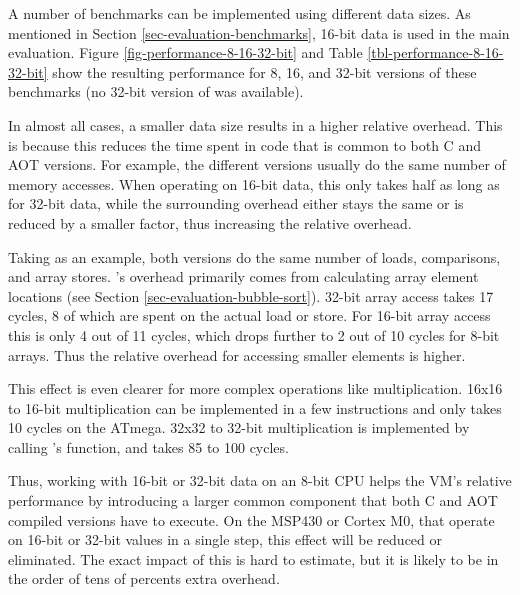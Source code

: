 A number of benchmarks can be implemented using different data sizes. As mentioned in Section \ref{sec-evaluation-benchmarks}, 16-bit data is used in the main evaluation. Figure \ref{fig-performance-8-16-32-bit} and Table \ref{tbl-performance-8-16-32-bit} show the resulting performance for 8, 16, and 32-bit versions of these benchmarks (no 32-bit version of  was available).

In almost all cases, a smaller data size results in a higher relative overhead. This is because this reduces the time spent in code that is common to both C and AOT versions. For example, the different versions usually do the same number of memory accesses. When operating on 16-bit data, this only takes half as long as for 32-bit data, while the surrounding overhead either stays the same or is reduced by a smaller factor, thus increasing the relative overhead.

Taking  as an example, both versions do the same number of loads, comparisons, and array stores. 's overhead primarily comes from calculating array element locations (see Section \ref{sec-evaluation-bubble-sort}). 32-bit array access takes 17 cycles, 8 of which are spent on the actual load or store. For 16-bit array access this is only 4 out of 11 cycles, which drops further to 2 out of 10 cycles for 8-bit arrays. Thus the relative overhead for accessing smaller elements is higher.

This effect is even clearer for more complex operations like multiplication. 16x16 to 16-bit multiplication can be implemented in a few instructions and only takes 10 cycles on the ATmega. 32x32 to 32-bit multiplication is implemented by calling 's  function, and takes 85 to 100 cycles.

Thus, working with 16-bit or 32-bit data on an 8-bit CPU helps the VM's relative performance by introducing a larger common component that both C and AOT compiled versions have to execute. On the MSP430 or Cortex M0, that operate on 16-bit or 32-bit values in a single step, this effect will be reduced or eliminated. The exact impact of this is hard to estimate, but it is likely to be in the order of tens of percents extra overhead.


